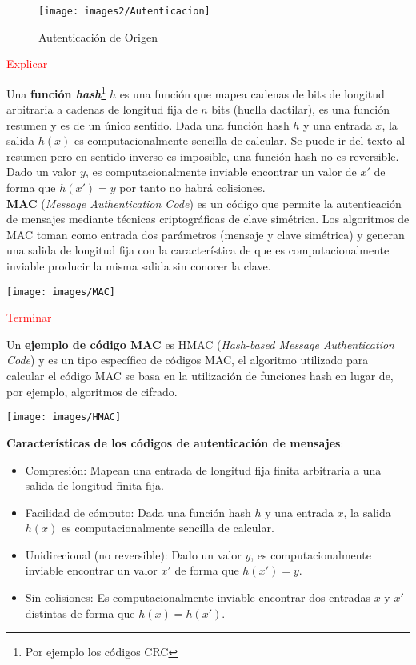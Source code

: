 \documentclass[10pt,portrait, twocolumn]{article}
\begin{document}
	\begin{figure}[ht!]
	\centering
	\texttt{[image: images2/Autenticacion]}
	\caption{Autenticación de Origen}
	\label{fig:Triada}
	\end{figure}
		\textcolor{red}{Explicar}

Una \textbf{función \textit{hash}}\footnote{Por ejemplo los códigos CRC} $h$ es una función que mapea cadenas de bits de longitud arbitraria a cadenas de longitud fija de $n$ bits (huella dactilar), es una función resumen y es de un único sentido. Dada una función hash $h$ y una entrada $x$, la salida $h(x)$ es computacionalmente sencilla de calcular. Se puede ir del texto al resumen pero en sentido inverso es imposible, una función hash no es reversible. Dado un valor $y$, es computacionalmente inviable encontrar un valor de $x'$ de forma que $h(x')=y$ por tanto no habrá colisiones.\\

\textbf{MAC} (\textit{Message Authentication Code}) es un código que permite la autenticación de mensajes mediante técnicas criptográficas de clave simétrica. Los algoritmos de MAC toman como entrada dos parámetros (mensaje y clave simétrica) y generan una salida de longitud fija con la característica de que es computacionalmente inviable producir la misma salida sin conocer la clave. 
	\begin{center}
		\texttt{[image: images/MAC]}
	\end{center}
	\textcolor{red}{Terminar}
	
Un \textbf{ejemplo de código MAC} es HMAC (\textit{Hash-based Message Authentication Code}) y es un tipo específico de códigos MAC, el algoritmo utilizado para calcular el código MAC se basa en la utilización de funciones hash en lugar de, por ejemplo, algoritmos de cifrado.
	
		\begin{center}
		\texttt{[image: images/HMAC]}
	\end{center}
	
\textbf{Características de los códigos de autenticación de mensajes}:

	\begin{itemize}
		\item Compresión: Mapean una entrada de longitud fija finita arbitraria a una salida de longitud finita fija.
		\item Facilidad de cómputo: Dada una función hash $h$ y una entrada $x$, la salida $h(x)$ es computacionalmente sencilla de calcular.
		\item Unidirecional (no reversible): Dado un valor $y$, es computacionalmente inviable encontrar un valor $x'$ de forma que $h(x')=y$.
		\item Sin colisiones: Es computacionalmente inviable encontrar dos entradas $x$ y $x'$ distintas de forma que $h(x) = h(x')$.
	\end{itemize}
	
\end{document}
